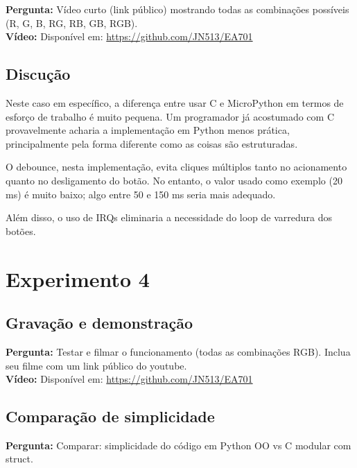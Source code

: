 \documentclass{article}
\begin{document}
\noindent
\textbf{Pergunta:} Vídeo curto (link público) mostrando todas as combinações possíveis (R, G, B, RG, RB, GB, RGB). \\

\noindent
\textbf{Vídeo:} Disponível em: \href{https://github.com/JN513/EA701}{https://github.com/JN513/EA701} 

\subsection{Discução}

Neste caso em específico, a diferença entre usar C e MicroPython em termos de esforço de trabalho é muito pequena. Um programador já acostumado com C provavelmente acharia a implementação em Python menos prática, principalmente pela forma diferente como as coisas são estruturadas.

O debounce, nesta implementação, evita cliques múltiplos tanto no acionamento quanto no desligamento do botão. No entanto, o valor usado como exemplo (20 ms) é muito baixo; algo entre 50 e 150 ms seria mais adequado.

Além disso, o uso de IRQs eliminaria a necessidade do loop de varredura dos botões.

\section{Experimento 4}

\subsection{Gravação e demonstração}

\noindent
\textbf{Pergunta:} Testar e filmar o funcionamento (todas as combinações RGB). Inclua seu filme com um link público do youtube. \\

\noindent
\textbf{Vídeo:} Disponível em: \href{https://github.com/JN513/EA701}{https://github.com/JN513/EA701} 

\subsection{Comparação de simplicidade}

\noindent
\textbf{Pergunta:} Comparar: simplicidade do código em Python OO vs C modular com struct. \\
\end{document}
